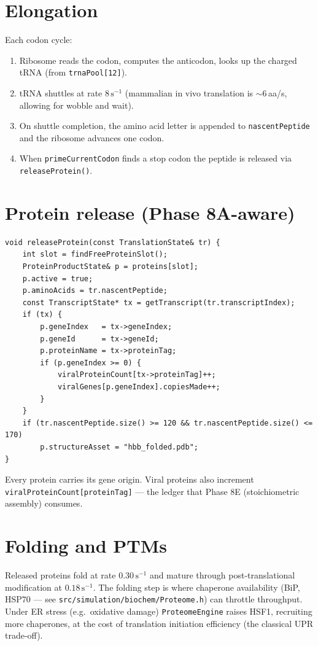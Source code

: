 \documentclass[11pt,letterpaper,twoside,openany]{book}
\newcommand{\code}[1]{\texttt{#1}}
\newcommand{\file}[1]{\texttt{\small#1}}
\begin{document}
\section{Elongation}

Each codon cycle:
\begin{enumerate}
  \item Ribosome reads the codon, computes the anticodon, looks up
        the charged tRNA (from \code{trnaPool[12]}).
  \item tRNA shuttles at rate \(8\,\text{s}^{-1}\) (mammalian in vivo
        translation is $\sim$6\,aa/s, allowing for wobble and wait).
  \item On shuttle completion, the amino acid letter is appended to
        \code{nascentPeptide} and the ribosome advances one codon.
  \item When \code{primeCurrentCodon} finds a stop codon the peptide
        is released via \code{releaseProtein()}.
\end{enumerate}

\section{Protein release (Phase 8A-aware)}

\begin{lstlisting}
void releaseProtein(const TranslationState& tr) {
    int slot = findFreeProteinSlot();
    ProteinProductState& p = proteins[slot];
    p.active = true;
    p.aminoAcids = tr.nascentPeptide;
    const TranscriptState* tx = getTranscript(tr.transcriptIndex);
    if (tx) {
        p.geneIndex   = tx->geneIndex;
        p.geneId      = tx->geneId;
        p.proteinName = tx->proteinTag;
        if (p.geneIndex >= 0) {
            viralProteinCount[tx->proteinTag]++;
            viralGenes[p.geneIndex].copiesMade++;
        }
    }
    if (tr.nascentPeptide.size() >= 120 && tr.nascentPeptide.size() <= 170)
        p.structureAsset = "hbb_folded.pdb";
}
\end{lstlisting}
Every protein carries its gene origin. Viral proteins also
increment \code{viralProteinCount[proteinTag]} --- the ledger that
Phase 8E (stoichiometric assembly) consumes.

\section{Folding and PTMs}

Released proteins fold at rate $0.30\,\text{s}^{-1}$ and mature
through post-translational modification at $0.18\,\text{s}^{-1}$.
The folding step is where chaperone availability (BiP, HSP70 --- see
\file{src/simulation/biochem/Proteome.h}) can throttle throughput.
Under ER stress (e.g.\ oxidative damage) \code{ProteomeEngine} raises
HSF1, recruiting more chaperones, at the cost of translation
initiation efficiency (the classical UPR trade-off).
\end{document}
